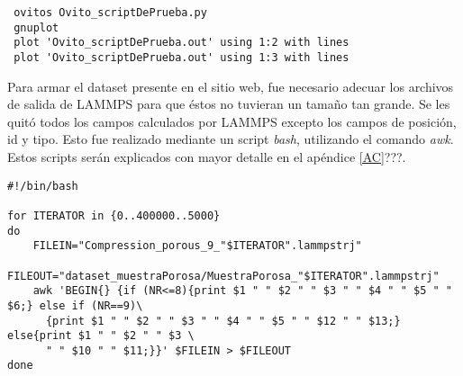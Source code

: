 \begin{lstlisting}
 ovitos Ovito_scriptDePrueba.py
 gnuplot
 plot 'Ovito_scriptDePrueba.out' using 1:2 with lines
 plot 'Ovito_scriptDePrueba.out' using 1:3 with lines
\end{lstlisting}

Para armar el dataset presente en el sitio web, fue necesario adecuar los archivos de salida de LAMMPS para que éstos no tuvieran un tamaño tan grande. Se les quitó todos los campos calculados por LAMMPS excepto los campos de posición, id y tipo. Esto fue realizado mediante un script \textit{bash}, utilizando el comando \textit{awk}. Estos scripts serán explicados con mayor detalle en el apéndice \ref{AC}???.

\begin{lstlisting}
#!/bin/bash

for ITERATOR in {0..400000..5000}
do
	FILEIN="Compression_porous_9_"$ITERATOR".lammpstrj"
	FILEOUT="dataset_muestraPorosa/MuestraPorosa_"$ITERATOR".lammpstrj"
	awk 'BEGIN{} {if (NR<=8){print $1 " " $2 " " $3 " " $4 " " $5 " " $6;} else if (NR==9)\
	  {print $1 " " $2 " " $3 " " $4 " " $5 " " $12 " " $13;} else{print $1 " " $2 " " $3 \
	  " " $10 " " $11;}}' $FILEIN > $FILEOUT
done
\end{lstlisting}

